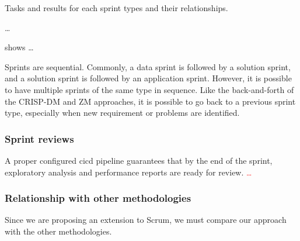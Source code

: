 \begin{figurebox}[label=fig:our-sprints]{Tasks and results for each sprint types and their relationships.}
  \tcblower
  \dots
\end{figurebox}

 shows \dots

Sprints are sequential.  Commonly, a data sprint is followed by a solution sprint, and a
solution sprint is followed by an application sprint.  However, it is possible to have
multiple sprints of the same type in sequence.  Like the back-and-forth of the CRISP-DM
and ZM approaches, it is possible to go back to a previous sprint type, especially
when new requirement or problems are identified.

\subsubsection{Sprint reviews}

A proper configured \gls{cicd} pipeline guarantees that by the end of the sprint,
exploratory analysis and performance reports are ready for review. \textcolor{red}{\dots}


\subsubsection{Relationship with other methodologies}

Since we are proposing an extension to Scrum, we must compare our approach with the other
methodologies.

